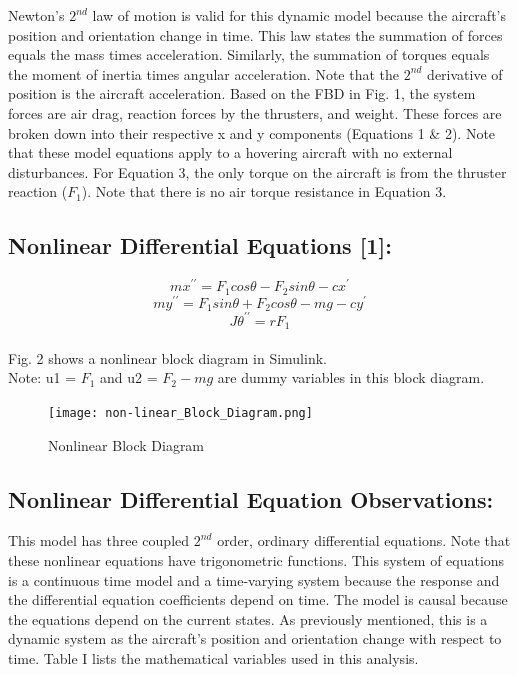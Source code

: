 \documentclass[conference]{IEEEtran}
\begin{document}
Newton's $2^{nd}$ law of motion is valid for this dynamic model because the aircraft's position and orientation change in time. This law states the summation of forces equals the mass times acceleration. Similarly, the summation of torques equals the moment of inertia times angular acceleration. Note that the $2^{nd}$ derivative of position is the aircraft acceleration. Based on the FBD in Fig. 1, the system forces are air drag, reaction forces by the thrusters, and weight. These forces are broken down into their respective x and y components (Equations 1 \& 2). Note that these model equations apply to a hovering aircraft with no external disturbances. For Equation 3, the only torque on the aircraft is from the thruster reaction ($F_1$). Note that there is no air torque resistance in Equation 3.

\subsection{Nonlinear Differential Equations [1]:} 
\[
mx^{\prime\prime} = F_1cos\theta - F_2sin\theta - cx^{\prime}  \tag{1}
\] 
\[
my^{\prime\prime} = F_1sin \theta + F_2cos\theta - mg - cy^\prime \tag{2}
\]
\[
J\theta^{\prime\prime} = rF_1 \tag{3} 
\]\\
Fig. 2 shows a nonlinear block diagram in Simulink. \\
Note: u1 = $F_1$ and u2 = $F_2-mg$ are dummy variables in this block diagram. \\
\vspace{-1.25mm}
\begin{figure}[!h]
\centerline{\texttt{[image: non-linear\_Block\_Diagram.png]}}
\caption{Nonlinear Block Diagram}
\label{figure}
\end{figure}

\subsection{Nonlinear Differential Equation Observations:}
This model has three coupled $2^{nd}$ order, ordinary differential equations. Note that these nonlinear equations have trigonometric functions. This system of equations is a continuous time model and a time-varying system because the response and the differential equation coefficients depend on time. The model is causal because the equations depend on the current states. As previously mentioned, this is a dynamic system as the aircraft's position and orientation change with respect to time. Table I lists the mathematical variables used in this analysis.\\
\end{document}

